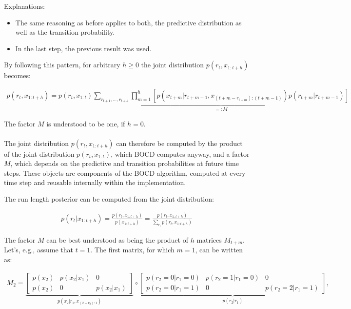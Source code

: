 \documentclass{article}
\begin{document}
Explanations:
\begin{itemize}
    \item The same reasoning as before applies to both, the predictive distribution as well as the transition probability.
    \item In the last step, the previous result was used.
\end{itemize}

By following this pattern, for arbitrary $h\geq0$ the joint distribution $p\left(r_{t},x_{1:t+h}\right)$ becomes:

\begin{align}
p(r_{t},x_{1:t+h})=p(r_{t},x_{1:t})\underbrace{\sum_{r_{t+1},...,r_{t+h}}\prod_{m=1}^{h}\left[p(x_{t+m}\vert r_{t+m-1},x_{(t+m-r_{t+m}):\left(t+m-1\right)})p(r_{t+m}\vert r_{t+m-1})\right]}_{=:M}
\end{align}

The factor $M$ is understood to be one, if $h=0$.\\\\

The joint distribution $p\left(r_{t},x_{1:t+h}\right)$ can therefore be computed by the product of the joint distribution $p(r_{t},x_{1:t})$, which BOCD computes anyway, and a factor $M$, which depends on the predictive and transition probabilities at future time steps. These objects are components of the BOCD algorithm, computed at every time step and reusable internally within the implementation.

The run length posterior can be computed from the joint distribution:

\begin{align}
p(r_{t}\vert x_{1:t+h})=\frac{p(r_{t},x_{1:t+h})}{p(x_{1:t+h})}=\frac{p(r_{t},x_{1:t+h})}{\sum_{r_{t}}p(r_{t},x_{1:t+h})}
\end{align}

The factor $M$ can be best understood as being the product of $h$ matrices $M_{t+m}$. Let's, e.g., assume that $t=1$. The first matrix, for which $m=1$, can be written as:

\begin{align}
M_{2}=\underbrace{\left[\begin{array}{ccc}
p(x_{2}) & p(x_{2}\vert x_{1}) & 0\\
p(x_{2}) & 0 & p(x_{2}\vert x_{1})
\end{array}\right]}_{p(x_{2}\vert r_{1},x_{(2-r_{2}):1})}\circ\underbrace{\left[\begin{array}{ccc}
p(r_{2}=0\vert r_{1}=0) & p(r_{2}=1\vert r_{1}=0) & 0\\
p(r_{2}=0\vert r_{1}=1) & 0 & p(r_{2}=2\vert r_{1}=1)
\end{array}\right]}_{p(r_{2}\vert r_{1})},
\end{align}
\end{document}
